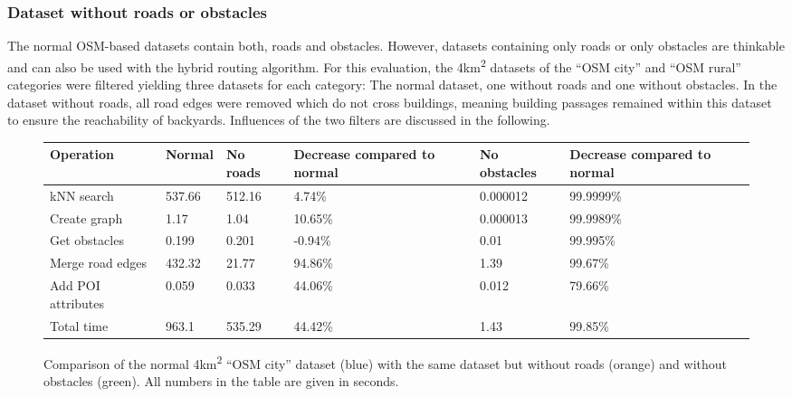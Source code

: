 		\subsubsection{Dataset without roads or obstacles}
		\label{subsubsec:dataset-without-roads-obstacles}
		
			The normal OSM-based datasets contain both, roads and obstacles.
			However, datasets containing only roads or only obstacles are thinkable and can also be used with the hybrid routing algorithm.
			For this evaluation, the 4km\textsuperscript{2} datasets of the \enquote{OSM city} and \enquote{OSM rural} categories were filtered yielding three datasets for each category:
			The normal dataset, one without roads and one without obstacles.
			In the dataset without roads, all road edges were removed which do not cross buildings, meaning building passages remained within this dataset to ensure the reachability of backyards.
			Influences of the two filters are discussed in the following.
			
			\begin{figure}[h!]
				\begin{figcenter}
					\begin{tabularx}{0.95\textwidth}{p{3cm}|X|XX|p{2.25cm}X}
\textbf{Operation} & \textbf{Normal} & \textbf{No roads} & \textbf{Decrease compared to normal} & \textbf{No obstacles} & \textbf{Decrease compared to normal} \\
\hline
kNN search			& 537.66	& 512.16	& 4.74\%						& 0.000012		& 99.9999\%						\\
Create graph		& 1.17		& 1.04		& 10.65\%						& 0.000013		& 99.9989\%						\\
Get obstacles		& 0.199		& 0.201		& -0.94\%						& 0.01			& 99.995\%						\\
Merge road edges	& 432.32	& 21.77		& 94.86\%						& 1.39			& 99.67\%						\\
Add POI attributes	& 0.059		& 0.033		& 44.06\%						& 0.012			& 79.66\%						\\
\hline
Total time			& 963.1		& 535.29	& 44.42\%						& 1.43			& 99.85\%
					\end{tabularx}
				\end{figcenter}
				\vspace{3ex}
				\begin{figcenter}
					
				\end{figcenter}
				\caption{Comparison of the normal 4km\textsuperscript{2} \enquote{OSM city} dataset (blue) with the same dataset but without roads (orange) and without obstacles (green). All numbers in the table are given in seconds.}
				\label{fig:eval-import-osm-no-roads-obstacles-city}
			\end{figure}
			
